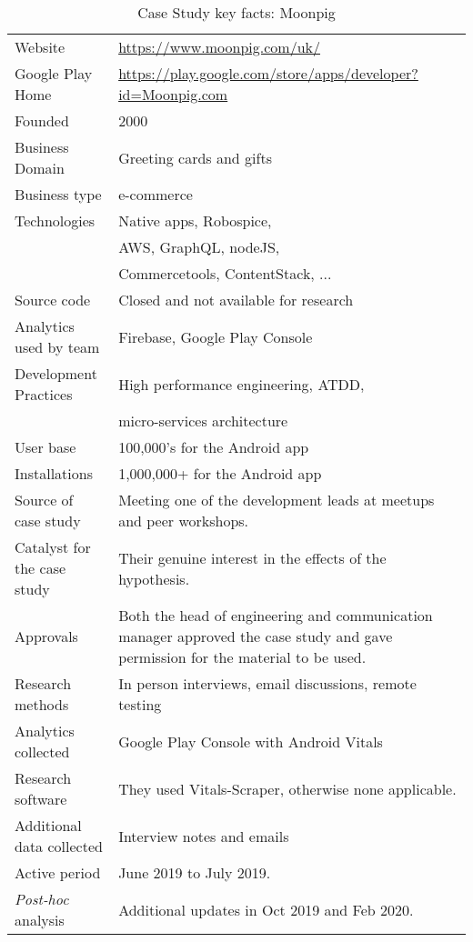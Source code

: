 \begin{table*}[h]
    \centering
    \renewcommand{\arraystretch}{0.8}%
    \small
    \setlength{\tabcolsep}{6pt}
    \begin{tabular}{L{5cm} L{10cm}}
       \toprule
       Website &\url{https://www.moonpig.com/uk/} \\
       Google Play Home & \url{https://play.google.com/store/apps/developer?id=Moonpig.com} \\
       Founded &2000 \\
       Business Domain & Greeting cards and gifts \\
       Business type & e-commerce \\
       Technologies  & Native apps, Robospice, \\
       & AWS, GraphQL, nodeJS, \\
       & Commercetools, ContentStack, ... \\
       Source code  &Closed and not available for research \\
       Analytics used by team &Firebase, Google Play Console \\
       Development Practices & High performance engineering, ATDD, \\
         & micro-services architecture \\
       \midrule
       User base &100,000's for the Android app\\
       Installations &1,000,000+ for the Android app\\
       \midrule
       Source of case study &Meeting one of the development leads at meetups and peer workshops. \\
       Catalyst for the case study & Their genuine interest in the effects of the hypothesis. \\
       Approvals &Both the head of engineering and communication manager approved the case study and gave permission for the material to be used. \\
       \midrule
       Research methods &In person interviews, email discussions, remote testing \\
       Analytics collected &Google Play Console with Android Vitals \\
       Research software &They used Vitals-Scraper, otherwise none applicable.\\
       Additional data collected &Interview notes and emails \\
       Active period &June 2019 to July 2019. \\
       \midrule
       \emph{Post-hoc} analysis & Additional updates in Oct 2019 and Feb 2020. \\
       \bottomrule
    \end{tabular}
    \caption{Case Study key facts: Moonpig}
    \label{tab:moonpig_anaytics_overview}
\end{table*}

